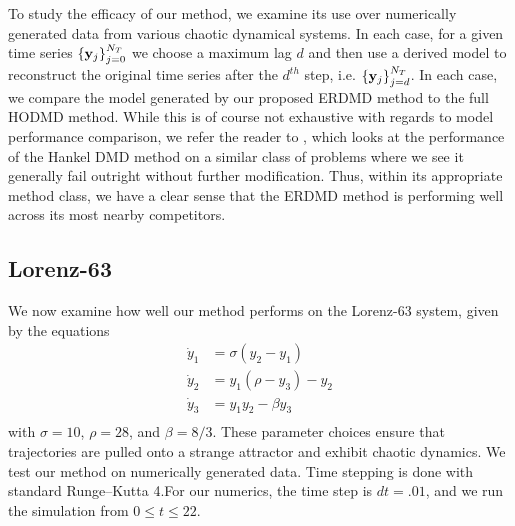 \documentclass[a4paper,11pt]{article}
\begin{document}
To study the efficacy of our method, we examine its use over numerically generated data from various chaotic dynamical systems.  In each case, for a given time series $\left\{{\bf y}_{j}\right\}_{j=0}^{N_{T}}$ we choose a maximum lag $d$ and then use a derived model to reconstruct the original time series after the $d^{th}$ step, i.e. $\left\{{\bf y}_{j}\right\}_{j=d}^{N_{T}}$. In each case, we compare the model generated by our proposed ERDMD method to the full HODMD method.  While this is of course not exhaustive with regards to model performance comparison, we refer the reader to \cite{curtis_dldmd}, which looks at the performance of the Hankel DMD method on a similar class of problems where we see it generally fail outright without further modification.  Thus, within its appropriate method class, we have a clear sense that the ERDMD method is performing well across its most nearby competitors.  
\subsection{Lorenz-63}
We now examine how well our method performs on the Lorenz-63 system, given by the equations
\begin{align*}
\dot{y}_{1} & = \sigma(y_{2}-y_{1})\\
\dot{y}_{2} & = y_{1}(\rho - y_{3}) - y_{2}\\
\dot{y}_{3} & = y_{1}y_{2}-\beta y_{3}\\
\end{align*}
with $\sigma=10$, $\rho=28$, and $\beta = 8/3$.  These parameter choices ensure that trajectories are pulled onto a strange attractor and exhibit chaotic dynamics.  We test our method on numerically generated data.  Time stepping is done with standard Runge--Kutta 4.For our numerics, the time step is $dt=.01$, and we run the simulation from $0\leq t \leq 22$.  
\end{document}
